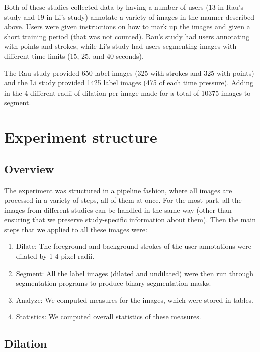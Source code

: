 \documentclass[12pt,a4paper,notitlepage]{article}
\begin{document}
Both of these studies collected data by having a number of users (13 in Rau's study and 19 in Li's study) annotate a variety of images in the manner described above. Users were given instructions on how to mark up the images and given a short training period (that was not counted). Rau's study had users annotating with points and strokes, while Li's study had users segmenting images with different time limits (15, 25, and 40 seconds).

The Rau study provided 650 label images (325 with strokes and 325 with points) and the Li study provided 1425 label images (475 of each time pressure). Adding in the 4 different radii of dilation per image made for a total of 10375 images to segment.

\section{Experiment structure}

\subsection{Overview}
The experiment was structured in a pipeline fashion, where all images are processed in a variety of steps, all of them at once. For the most part, all the images from different studies can be handled in the same way (other than ensuring that we preserve study-specific information about them). Then the main steps that we applied to all these images were:

\begin{enumerate}
	\item Dilate: The foreground and background strokes of the user annotations were dilated by 1-4 pixel radii.
	\item Segment: All the label images (dilated and undilated) were then run through segmentation programs to produce binary segmentation masks.
	\item Analyze: We computed measures for the images, which were stored in tables.
	\item Statistics: We computed overall statistics of these measures.
\end{enumerate}

\subsection{Dilation}
\end{document}

